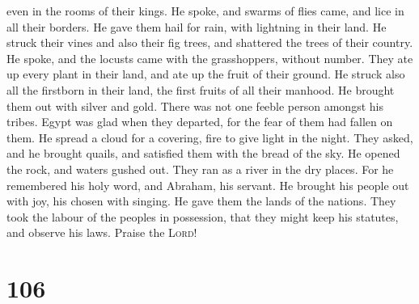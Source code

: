 even in the rooms of their kings.  He spoke, and swarms
of flies came, and lice in all their borders.  He gave
them hail for rain, with lightning in their land.  He
struck their vines and also their fig trees, and shattered the trees of
their country.  He spoke, and the locusts came with the
grasshoppers, without number.  They ate up every plant in
their land, and ate up the fruit of their ground.  He
struck also all the firstborn in their land, the first fruits of all
their manhood.  He brought them out with silver and gold.
There was not one feeble person amongst his tribes. 
Egypt was glad when they departed, for the fear of them had fallen on
them.  He spread a cloud for a covering, fire to give
light in the night.  They asked, and he brought quails,
and satisfied them with the bread of the sky.  He opened
the rock, and waters gushed out. They ran as a river in the dry places.
 For he remembered his holy word, and Abraham, his
servant.  He brought his people out with joy, his chosen
with singing.  He gave them the lands of the nations.
They took the labour of the peoples in possession,  that
they might keep his statutes, and observe his laws. Praise the
\textsc{Lord}!

\hypertarget{section-105}{%
\section{106}\label{section-105}}

